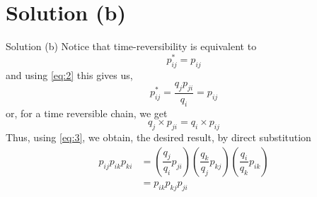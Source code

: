\documentclass{beamer}
\begin{document}
\section{Solution (b)}
\begin{frame}{Solution (b)}
Notice that time-reversibility is equivalent to
\begin{equation}
    p_{ij}^{*} = p_{ij}
    \label{eq:3}
\end{equation}
and using \eqref{eq:2} this gives us,
\begin{equation}
    p_{ij}^{*} = \dfrac{q_{j}p_{ji}}{q_{i}} = p_{ij}
\end{equation}
or, for a time reversible chain, we get
\begin{equation}
    q_{j} \times p_{ji} = q_{i} \times p_{ij}
\end{equation}
Thus, using \eqref{eq:3}, we obtain, the desired result, by direct substitution
\begin{align}
    p_{ij}p_{ik}p_{ki} &= (\dfrac{q_{j}}{q_{i}}p_{ji})(\dfrac{q_{k}}{q_{j}}p_{kj})(\dfrac{q_{i}}{q_{k}}p_{ik}) \\
    &= p_{ik}p_{kj}p_{ji}   
\end{align}
    
\end{frame}
\end{document}
